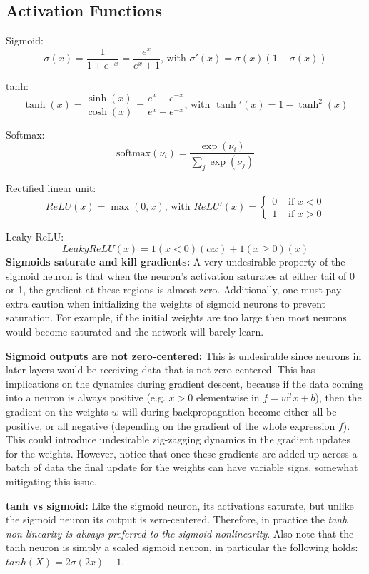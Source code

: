 \documentclass[12pt]{article}
\begin{document}
\subsection{Activation Functions}
\ulb
\item Sigmoid: \[ \sigma(x) = \frac{1}{1 + e^{-x}} = \frac{e^x}{e^x + 1} \text{, with } \sigma'(x) = \sigma(x)(1-\sigma(x)) \]
\item tanh:
\[ \tanh(x) = \frac{\sinh(x)}{\cosh(x)} = \frac{e^x - e^{-x}}{e^x + e^{-x}} \text{, with } \tanh'(x) = 1-\tanh^2(x) \]
\item Softmax: \[ \text{softmax}(\nu_i) = \frac{\exp(\nu_i)}{\sum_j \exp(\nu_j)} \]
\item Rectified linear unit:
\[ ReLU(x) = \max (0,x) \text{, with } ReLU'(x) = \begin{cases} 0 & \text{ if } x<0 \\ 1 & \text{ if } x>0 \end{cases} \]
\item Leaky ReLU:
\[ LeakyReLU(x) = 1(x<0)(\alpha x) + 1(x\geq 0)(x) \]
\ule
\textbf{Sigmoids saturate and kill gradients:} A very undesirable property of the sigmoid neuron is that when the neuron's activation saturates at either tail of 0 or 1, the gradient at these regions is almost zero. Additionally, one must pay extra caution when initializing the weights of sigmoid neurons to prevent saturation. For example, if the initial weights are too large then most neurons would become saturated and the network will barely learn.
\par \textbf{Sigmoid outputs are not zero-centered:} This is undesirable since neurons in later layers would be receiving data that is not zero-centered. This has implications on the dynamics during gradient descent, because if the data coming into a neuron is always positive (e.g. $x>0$ elementwise in $f=w^Tx+b$), then the gradient on the weights $w$ will during backpropagation become either all be positive, or all negative (depending on the gradient of the whole expression $f$). This could introduce undesirable zig-zagging dynamics in the gradient updates for the weights. However, notice that once these gradients are added up across a batch of data the final update for the weights can have variable signs, somewhat mitigating this issue.
\par \textbf{tanh vs sigmoid:} Like the sigmoid neuron, its activations saturate, but unlike the sigmoid neuron its output is zero-centered. Therefore, in practice the \textit{tanh non-linearity is always preferred to the sigmoid nonlinearity}. Also note that the tanh neuron is simply a scaled sigmoid neuron, in particular the following holds: $tanh(X) = 2\sigma(2x) - 1$.
\end{document}
